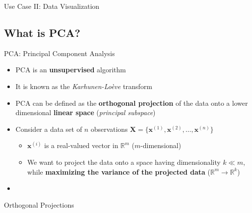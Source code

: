 \begin{frame}{Use Case II: Data Visualization}
{\begin{figure}
		\end{figure}
	}
\end{frame}


\subsection{What is PCA?}

\begin{frame}{PCA: Principal Component Analysis}{}
	\begin{itemize}
		\item PCA is an \textbf{unsupervised} algorithm
		\item It is known as the \textit{Karhunen-Lo\`{e}ve} transform
		\item PCA can be defined as the \textbf{orthogonal projection} of the data onto a lower dimensional
			\textbf{linear space} (\textit{principal subspace})
		\item Consider a data set of $n$ observations $\bm{X} = \{ \bm{x}^{(1)}, \bm{x}^{(2)}, \dots, \bm{x}^{(n)} \}$
		\begin{itemize}
			\item $\bm{x}^{(i)}$ is a real-valued vector in $\mathbb{R}^m$ ($m$-dimensional)
			\item We want to project the data onto a space having dimensionality $k \ll m$, while \textbf{maximizing
				the variance of the projected data} ($\mathbb{R}^m \rightarrow \mathbb{R}^k$)
		\end{itemize}
		\item {}
	\end{itemize}
\end{frame}


\begin{frame}{Orthogonal Projections}{}
\end{frame}


